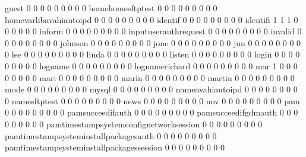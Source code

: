 \documentclass[compress,8pt]{beamer}
\begin{document}
\begin{frame}
\begin{Schunk}
  guest                                      0   0   0   0   0   0   0   0   0
  homehomesftptest                           0   0   0   0   0   0   0   0   0
  homevarlibavahiautoipd                     0   0   0   0   0   0   0   0   0
  identif                                    0   0   0   0   0   0   0   0   0
  identifi                                   1   1   1   0   0   0   0   0   0
  inform                                     0   0   0   0   0   0   0   0   0
  inputuserauthrequest                       0   0   0   0   0   0   0   0   0
  invalid                                    0   0   0   0   0   0   0   0   0
  johnson                                    0   0   0   0   0   0   0   0   0
  jone                                       0   0   0   0   0   0   0   0   0
  jun                                        0   0   0   0   0   0   0   0   0
  lee                                        0   0   0   0   0   0   0   0   0
  linda                                      0   0   0   0   0   0   0   0   0
  listen                                     0   0   0   0   0   0   0   0   0
  login                                      0   0   0   0   0   0   0   0   0
  logname                                    0   0   0   0   0   0   0   0   0
  lognamerichard                             0   0   0   0   0   0   0   0   0
  mar                                        1   0   0   0   0   0   0   0   0
  mari                                       0   0   0   0   0   0   0   0   0
  marin                                      0   0   0   0   0   0   0   0   0
  martin                                     0   0   0   0   0   0   0   0   0
  mode                                       0   0   0   0   0   0   0   0   0
  mysql                                      0   0   0   0   0   0   0   0   0
  nameavahiautoipd                           0   0   0   0   0   0   0   0   0
  namesftptest                               0   0   0   0   0   0   0   0   0
  news                                       0   0   0   0   0   0   0   0   0
  nov                                        0   0   0   0   0   0   0   0   0
  pam                                        0   0   0   0   0   0   0   0   0
  pamsucceedifauth                           0   0   0   0   0   0   0   0   0
  pamsucceedifgdmauth                        0   0   0   0   0   0   0   0   0
  pamtimestampsystemconfignetworksession     0   0   0   0   0   0   0   0   0
  pamtimestampsysteminstallpackagesauth      0   0   0   0   0   0   0   0   0
  pamtimestampsysteminstallpackagessession   0   0   0   0   0   0   0   0   0

\end{Schunk}
\end{frame}
\end{document}
